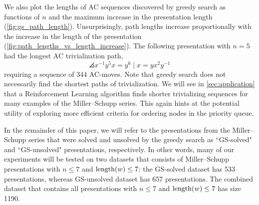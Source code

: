 We also plot the lengths of AC sequences discovered by greedy search as functions of $n$ and the maximum increase in the presentation length (\autoref{fig:gs_path_length}).
Unsurprisingly, path lengths increase proportionally with the increase in the length of the presentation (\autoref{fig:path_lengths_vs_length_increase}).
The following presentation with $n=5$ had the longest AC trivialization path,
\[
\angles{x^{-1} y^5 x = y^6 \mid x = y x^2 y^{-1}}
\]
requiring a sequence of 344 AC-moves.
Note that greedy search does not necessarily find the shortest paths of trivialization.
We will see in \autoref{sec:application} that a Reinforcement Learning algorithm finds shorter trivializing sequences for many examples of the Miller--Schupp series.
This again hints at the potential utility of exploring more efficient criteria for ordering nodes in the priority queue.

In the remainder of this paper, we will refer to the presentations from the Miller--Schupp series that were solved and unsolved by the greedy search as ``GS-solved" and ``GS-unsolved" presentations, respectively. In other words, many of our experiments will be tested on two datasets that consists of Miller--Schupp presentations with $n \leq 7$ and $\operatorname{length}(w) \leq 7$: the GS-solved dataset has 533 presentations, whereas GS-unsolved dataset has 657 presentations. The combined dataset that contains all presentations with $n \leq 7$ and $\operatorname{length}(w) \leq 7$ has size 1190.


